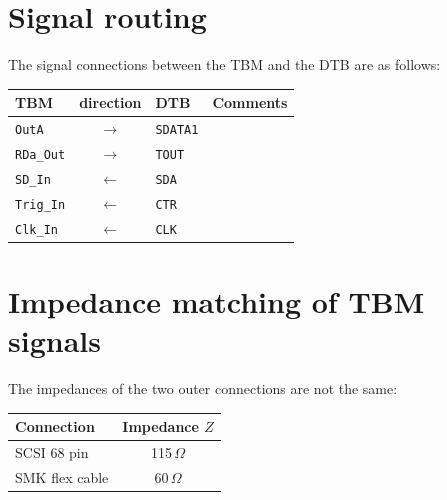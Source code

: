 \section{Signal routing}

The signal connections between the TBM and the DTB are as follows:
\begin{center}
\begin{tabular}{lcll}
    \toprule %
    TBM & direction & DTB & Comments \\
    \midrule %
    \texttt{OutA}        & $\rightarrow$ & \texttt{SDATA1} & \\
    \texttt{RDa\_Out}    & $\rightarrow$ & \texttt{TOUT}   & \\
    \texttt{SD\_In}      & $\leftarrow$  & \texttt{SDA}    & \\
    \texttt{Trig\_In}    & $\leftarrow$  & \texttt{CTR}    & \\
    \texttt{Clk\_In}     & $\leftarrow$  & \texttt{CLK}    & \\
    \bottomrule %
\end{tabular}
\end{center}

\section{Impedance matching of TBM signals}

The impedances of the two outer connections are not the same:
\begin{center}
\begin{tabular}{lc}
    \toprule %
    Connection & Impedance $Z$ \\
    \midrule %
    SCSI 68 pin & 115\,$\Omega$ \\
    SMK flex cable & 60\,$\Omega$ \\
    \bottomrule %
\end{tabular}
\end{center}

